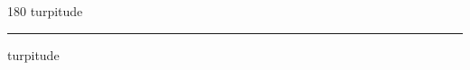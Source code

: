 
\begin{frame}
\begin{center}
\begin{turn}{180}
{\fontsize{2.5cm}{1em}\selectfont turpitude}
\end{turn}
\vspace{1em}\par  
\hrule
\vspace{1em}\par  
{\fontsize{2.5cm}{1em}\selectfont turpitude}
\end{center}
\end{frame}
